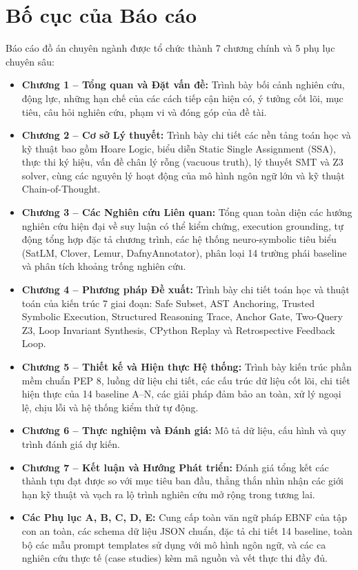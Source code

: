 \section{Bố cục của Báo cáo}
\label{sec:report_organization}
Báo cáo đồ án chuyên ngành được tổ chức thành 7 chương chính và 5 phụ lục chuyên sâu:
\begin{itemize}
    \item \textbf{Chương 1 -- Tổng quan và Đặt vấn đề:} Trình bày bối cảnh nghiên cứu, động lực, những hạn chế của các cách tiếp cận hiện có, ý tưởng cốt lõi, mục tiêu, câu hỏi nghiên cứu, phạm vi và đóng góp của đề tài.
    \item \textbf{Chương 2 -- Cơ sở Lý thuyết:} Trình bày chi tiết các nền tảng toán học và kỹ thuật bao gồm Hoare Logic, biểu diễn Static Single Assignment (SSA), thực thi ký hiệu, vấn đề chân lý rỗng (vacuous truth), lý thuyết SMT và Z3 solver, cùng các nguyên lý hoạt động của mô hình ngôn ngữ lớn và kỹ thuật Chain-of-Thought.
    \item \textbf{Chương 3 -- Các Nghiên cứu Liên quan:} Tổng quan toàn diện các hướng nghiên cứu hiện đại về suy luận có thể kiểm chứng, execution grounding, tự động tổng hợp đặc tả chương trình, các hệ thống neuro-symbolic tiêu biểu (SatLM, Clover, Lemur, DafnyAnnotator), phân loại 14 trường phái baseline và phân tích khoảng trống nghiên cứu.
    \item \textbf{Chương 4 -- Phương pháp Đề xuất:} Trình bày chi tiết toán học và thuật toán của kiến trúc 7 giai đoạn: Safe Subset, AST Anchoring, Trusted Symbolic Execution, Structured Reasoning Trace, Anchor Gate, Two-Query Z3, Loop Invariant Synthesis, CPython Replay và Retrospective Feedback Loop.
    \item \textbf{Chương 5 -- Thiết kế và Hiện thực Hệ thống:} Trình bày kiến trúc phần mềm chuẩn PEP 8, luồng dữ liệu chi tiết, các cấu trúc dữ liệu cốt lõi, chi tiết hiện thực của 14 baseline A--N, các giải pháp đảm bảo an toàn, xử lý ngoại lệ, chịu lỗi và hệ thống kiểm thử tự động.
    \item \textbf{Chương 6 -- Thực nghiệm và Đánh giá:} Mô tả dữ liệu, cấu hình và quy trình đánh giá dự kiến.
    \item \textbf{Chương 7 -- Kết luận và Hướng Phát triển:} Đánh giá tổng kết các thành tựu đạt được so với mục tiêu ban đầu, thẳng thắn nhìn nhận các giới hạn kỹ thuật và vạch ra lộ trình nghiên cứu mở rộng trong tương lai.
    \item \textbf{Các Phụ lục A, B, C, D, E:} Cung cấp toàn văn ngữ pháp EBNF của tập con an toàn, các schema dữ liệu JSON chuẩn, đặc tả chi tiết 14 baseline, toàn bộ các mẫu prompt templates sử dụng với mô hình ngôn ngữ, và các ca nghiên cứu thực tế (case studies) kèm mã nguồn và vết thực thi đầy đủ.
\end{itemize}
